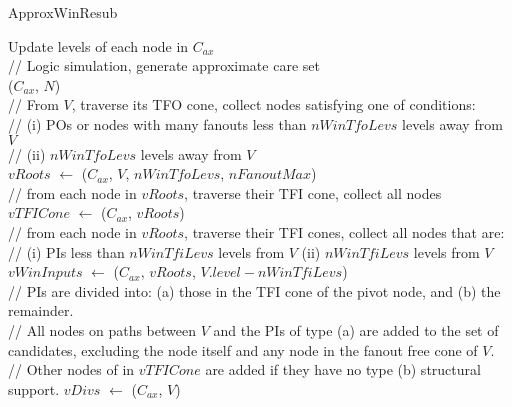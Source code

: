 \documentclass{rpt}
\begin{document}
\begin{algorithm}[H]
    \caption{\small ApproxWinResub}
    \begin{small}

        \vspace{1em}
        Update levels of each node in $C_{ax}$\\

        \vspace{1em}
        // Logic simulation, generate approximate care set\\
        \Simulate($C_{ax}$, $N$)\\

        \vspace{1em}
        // From $V$, traverse its TFO cone, collect nodes satisfying one of conditions:\\
        // (i) POs or nodes with many fanouts less than $nWinTfoLevs$ levels away from $V$\\
        // (ii) $nWinTfoLevs$ levels away from $V$\\
        $vRoots$ $\leftarrow$ \FindRoots($C_{ax}$, $V$, $nWinTfoLevs$, $nFanoutMax$)\\

        \vspace{1em}
        // from each node in $vRoots$, traverse their TFI cone, collect all nodes\\
        $vTFICone$ $\leftarrow$ \FindTFICone($C_{ax}$, $vRoots$)\\

        \vspace{1em}
        // from each node in $vRoots$, traverse their TFI cones, collect all nodes that are:\\
        // (i) PIs less than $nWinTfiLevs$ levels from $V$ (ii) $nWinTfiLevs$ levels from $V$\\
        $vWinInputs$ $\leftarrow$ \FindWinInputs($C_{ax}$, $vRoots$, $V.level - nWinTfiLevs$)\\

        \vspace{1em}
        // PIs are divided into: (a) those in the TFI cone of the pivot node, and (b) the remainder.\\
        // All nodes on paths between $V$ and the PIs of type (a) are added to the set of candidates,
        excluding the node itself and any node in the fanout free cone of $V$.\\
        // Other nodes of in $vTFICone$ are added if they have no type (b) structural support.
        $vDivs$ $\leftarrow$ \FindDivisors($C_{ax}$, $V$)\\


\end{small}
\end{algorithm}
\end{document}
